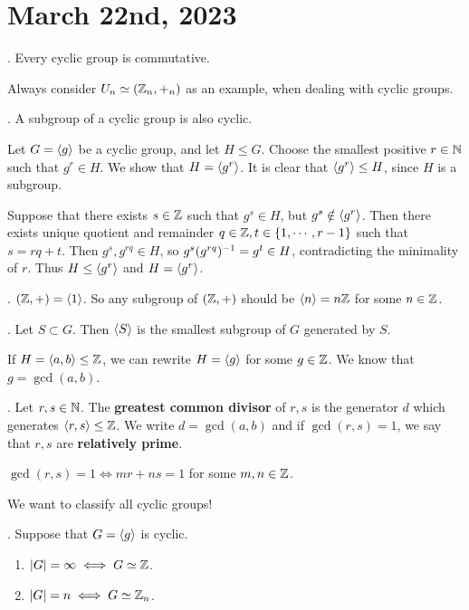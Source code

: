 \section*{March 22nd, 2023}


\thm. Every cyclic group is commutative.

Always consider \(U_n \simeq (\mathbb{Z}_n, +_n)\) as an example, when dealing with cyclic groups.

\thm. A subgroup of a cyclic group is also cyclic.

\pf Let \(G = \left\langle g \right\rangle\) be a cyclic group, and let \(H \leq G\). Choose the smallest positive \(r \in \mathbb{N}\) such that \(g^r \in H\). We show that \(H = \left\langle g^r \right\rangle\). It is clear that \(\left\langle g^r \right\rangle \leq H\), since \(H\) is a subgroup.

Suppose that there exists \(s \in \mathbb{Z}\) such that \(g^s \in H\), but \(g^s \notin \left\langle g^r \right\rangle\). Then there exists unique quotient and remainder \(q \in \mathbb{Z}, t \in \{1, \cdots, r - 1\}\) such that \(s = rq + t\). Then \(g^s, g^{rq} \in H\), so \(g^s(g^{rq})^{-1} = g^t \in H\), contradicting the minimality of \(r\). Thus \(H \leq \left\langle g^r \right\rangle\) and \(H = \left\langle g^r \right\rangle\).

\ex. \((\mathbb{Z}, +) = \left\langle 1 \right\rangle\). So any subgroup of \((\mathbb{Z}, +)\) should be \(\left\langle n \right\rangle = n\mathbb{Z}\) for some \(n \in \mathbb{Z}\).

. Let \(S \subset G\). Then \(\left\langle S \right\rangle\) is the smallest subgroup of \(G\) generated by \(S\).

If \(H = \left\langle a, b \right\rangle \leq \mathbb{Z}\), we can rewrite \(H = \left\langle g \right\rangle\) for some \(g \in \mathbb{Z}\). We know that \(g = \gcd(a, b)\).

.  Let \(r, s \in \mathbb{N}\). The \textbf{greatest common divisor} of \(r, s\) is the generator \(d\) which generates \(\left\langle r, s \right\rangle \leq \mathbb{Z}\). We write \(d = \gcd(a, b)\) and if \(\gcd(r, s) = 1\), we say that \(r, s\) are \textbf{relatively prime}.

\rmk \(\gcd(r, s) = 1 \iff mr + ns = 1\) for some \(m, n \in \mathbb{Z}\).

We want to classify all cyclic groups!

\thm.  Suppose that \(G = \left\langle g \right\rangle\) is cyclic.
\begin{enumerate}
    \item \(\left| G \right| = \infty \iff G \simeq \mathbb{Z}\).
    \item \(\left| G \right| = n \iff G \simeq \mathbb{Z}_n\).
\end{enumerate}

